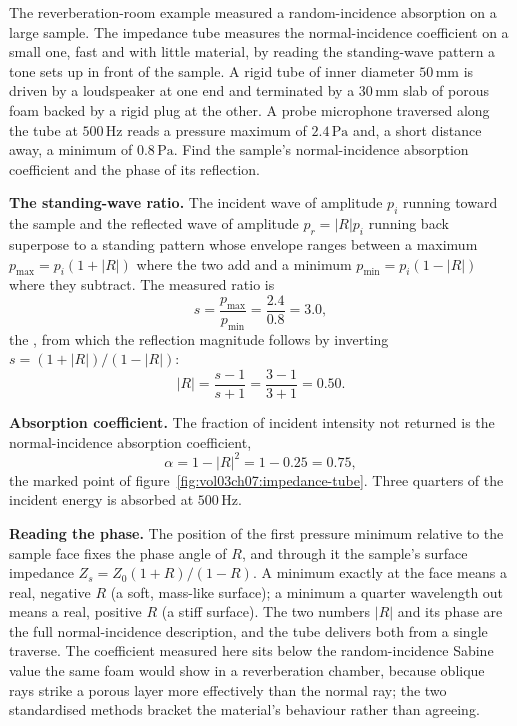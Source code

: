 The reverberation-room example measured a random-incidence absorption on a
large sample. The impedance tube measures the normal-incidence coefficient
on a small one, fast and with little material, by reading the standing-wave
pattern a tone sets up in front of the sample. A rigid tube of inner
diameter $50\,\si{\milli\meter}$ is driven by a loudspeaker at one end and
terminated by a $30\,\si{\milli\meter}$ slab of porous foam backed by a rigid
plug at the other. A probe microphone traversed along the tube at
$500\,\si{\hertz}$ reads a pressure maximum of $2.4\,\si{\pascal}$ and, a
short distance away, a minimum of $0.8\,\si{\pascal}$. Find the sample's
normal-incidence absorption coefficient and the phase of its reflection.

\textbf{The standing-wave ratio.} The incident wave of amplitude $p_i$
running toward the sample and the reflected wave of amplitude $p_r=|R|p_i$
running back superpose to a standing pattern whose envelope ranges between a
maximum $p_{\max}=p_i(1+|R|)$ where the two add and a minimum
$p_{\min}=p_i(1-|R|)$ where they subtract. The measured ratio is
\[
s = \frac{p_{\max}}{p_{\min}} = \frac{2.4}{0.8} = 3.0 ,
\]
the , from which the reflection magnitude
follows by inverting $s=(1+|R|)/(1-|R|)$:
\[
|R| = \frac{s-1}{s+1} = \frac{3-1}{3+1} = 0.50 .
\]

\textbf{Absorption coefficient.} The fraction of incident intensity not
returned is the normal-incidence absorption coefficient,
\[
\alpha = 1 - |R|^2 = 1 - 0.25 = 0.75 ,
\]
the marked point of figure~\ref{fig:vol03ch07:impedance-tube}. Three
quarters of the incident energy is absorbed at $500\,\si{\hertz}$.

\textbf{Reading the phase.} The position of the first pressure minimum
relative to the sample face fixes the phase angle of $R$, and through it the
sample's surface impedance $Z_s = Z_0(1+R)/(1-R)$. A minimum exactly at the
face means a real, negative $R$ (a soft, mass-like surface); a minimum a
quarter wavelength out means a real, positive $R$ (a stiff surface). The two
numbers $|R|$ and its phase are the full normal-incidence description, and
the tube delivers both from a single traverse. The coefficient measured here
sits below the random-incidence Sabine value the same foam would show in a
reverberation chamber, because oblique rays strike a porous layer more
effectively than the normal ray; the two standardised methods bracket the
material's behaviour rather than agreeing.



